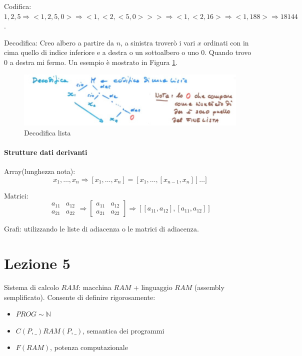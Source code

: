\documentclass{article}
\begin{document}
Codifica: $1,2,5 \Rightarrow <1,2,5,0> \Rightarrow <1,<2,<5,0>>> \Rightarrow <1,<2,16> \Rightarrow <1,188> \Rightarrow 18144$.



Decodifica: Creo albero a partire da $n$, a sinistra troverò i vari $x$ ordinati con in cima quello di indice inferiore e a destra o un sottoalbero o uno $0$. Quando trovo $0$ a destra mi fermo.
Un esempio è mostrato in Figura \ref{declista}.

\begin{figure}
\label{declista}
\caption{Decodifica lista}
\begin{center}
\includegraphics[scale=0.7]{"img/declista.png"}
\end{center}
\end{figure}

\paragraph{Strutture dati derivanti}


Array(lunghezza nota):
\begin{displaymath}
	x_1, \dots, x_n \Rightarrow [x_1, \dots, x_n] = [x_1, \dots, [x_{n-1}, x_n]] \dots ]
\end{displaymath}

Matrici:
\begin{displaymath}
\begin{matrix}
a_{11} & a_{12} \\
a_{21} & a_{22}
\end{matrix}
\Rightarrow
\begin{bmatrix}
a_{11} & a_{12} \\
a_{21} & a_{22}
\end{bmatrix}
\Rightarrow
[[a_{11}, a_{12}], [a_{11}, a_{12}]]
\end{displaymath}

Grafi: utilizzando le liste di adiacenza o le matrici di adiacenza.

\section{Lezione 5}
Sistema di calcolo $\textit{RAM}$: macchina $\textit{RAM}$ + linguaggio $\textit{RAM}$ (assembly semplificato). Consente di definire rigorosamente:
\begin{itemize}
	\item $\textit{PROG} \sim \mathbb{N}$
	\item $C(P, \_) \textit{RAM}(P, \_) $, semantica dei programmi
	\item $F(\textit{RAM})$, potenza computazionale
\end{itemize}
\end{document}
